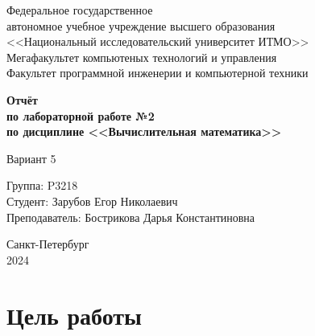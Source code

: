 \documentclass[14pt]{article}
\begin{document}
\thispagestyle{empty}

\begin{center}
    Федеральное государственное\\
    автономное учебное учреждение высшего образования\\
    <<Национальный исследовательский университет ИТМО>>\\
\vspace{0.5cm}
    Мегафакультет компьютеных технологий и управления\\
    Факультет программной инженерии и компьютерной техники
\end{center}

\vspace{3cm}

\begin{center}
\Large
\textbf{
    Отчёт\\
    по лабораторной работе №2\\
    по дисциплине <<Вычислительная математика>>
}
\end{center}

\begin{center}
\large
    Вариант 5
\end{center}

\vspace{5cm}

\begin{flushright}
    Группа: P3218\\
    \vspace{0.2cm}
    Студент: Зарубов Егор Николаевич\\
    \vspace{0.2cm}
    Преподаватель: Бострикова Дарья Константиновна
\end{flushright}

\vspace{5cm}

\begin{center}
    Санкт-Петербург\\
    2024
\end{center}

\newpage

\tableofcontents

\setcounter{page}{0}
\thispagestyle{empty}

\newpage

\section{Цель работы}
\end{document}
